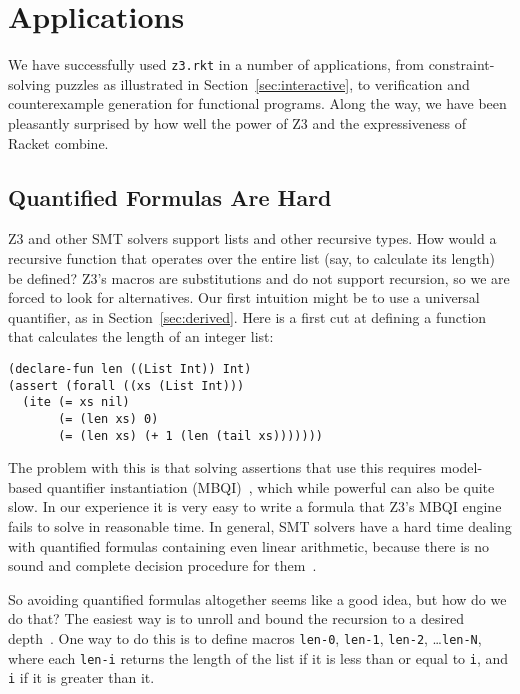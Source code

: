 \section{Applications}

We have successfully used \texttt{z3.rkt} in a number of applications, from
constraint-solving puzzles as illustrated in Section~\ref{sec:interactive}, to
verification and counterexample generation for functional programs. Along the
way, we have been pleasantly surprised by how well the power of Z3 and the
expressiveness of Racket combine.

\subsection{Quantified Formulas Are Hard}
\label{sec:quantified}

Z3 and other SMT solvers support lists and other recursive types. How would a
recursive function that operates over the entire list (say, to calculate its
length) be defined? Z3's macros are substitutions and do not support
recursion, so we are forced to look for alternatives. Our first intuition
might be to use a universal quantifier, as in Section~\ref{sec:derived}. Here
is a first cut at defining a function that calculates the length of an integer
list:

\begin{verbatim}
(declare-fun len ((List Int)) Int)
(assert (forall ((xs (List Int)))
  (ite (= xs nil)
       (= (len xs) 0)
       (= (len xs) (+ 1 (len (tail xs)))))))
\end{verbatim}

The problem with this is that solving assertions that use this requires model-
based quantifier instantiation (MBQI)~\cite{mbqi}, which while powerful can
also be quite slow. In our experience it is very easy to write a formula that
Z3's MBQI engine fails to solve in reasonable time. In general, SMT solvers
have a hard time dealing with quantified formulas containing even linear
arithmetic, because there is no sound and complete decision procedure for
them~\cite{halpern91}.

So avoiding quantified formulas altogether seems like a good idea, but how do
we do that? The easiest way is to unroll and bound the recursion to a desired
depth~\cite{sat-recursive}. One way to do this is to define macros
\texttt{len-0}, \texttt{len-1}, \texttt{len-2}, \ldots \texttt{len-N}, where
each \texttt{len-i} returns the length of the list if it is less than or equal
to \texttt{i}, and \texttt{i} if it is greater than it.

